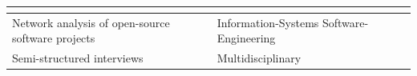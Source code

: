 \documentclass[CHICAGO,Times1COL]{WileyNJDv5} %
\begin{document}
{\begin{table}[h]
\begin{threeparttable}
\begin{tabular}{|l|m{3.1cm}|m{4.3cm}|}
 { %
 \citet{lundvall1992} \newline 
 \citet{cambrosio_mapping_2004} %
} \\
 \hline
 {Network  analysis of open-source software projects } &
 {\centering   Information-Systems \newline Software-Engineering }
 &
 \citet{McCleanGreer_et_al2021} \newline
 \citet{HerboldAmirfallah_et_al2021}
\\
 \hline
 {Semi-structured interviews } &
 {\centering   Multidisciplinary}
 &
 \citet{galletta2013mastering}  \newline \citet{Adams2015}
\\
 \bottomrule
\end{tabular}
%
%

\end{threeparttable}
\end{table}
}
\end{document}
